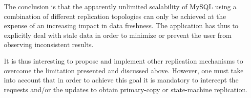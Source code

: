 The conclusion is that the apparently unlimited scalability of MySQL using a combination of different replication topologies can only be achieved at the expense of an increasing impact in data freshness. The application has thus to explicitly deal with stale data in order to minimize or prevent the user from observing inconsistent results.

It is thus interesting to propose and implement other replication mechanisms to overcome the limitation presented and discussed above. However, one must take into account that in order to achieve this goal it is mandatory to intercept the requests and/or the updates to obtain primary-copy or state-machine replication.